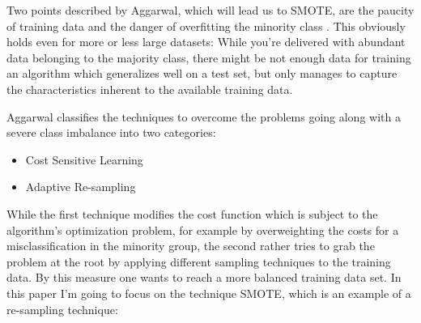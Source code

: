 \documentclass[12pt,a4paper]{article}
\begin{document}
Two points described by Aggarwal, which will lead us to SMOTE, are the paucity of training data and the danger of overfitting the minority class \cite{aggarwalClassBook}. This obviously holds even for more or less large datasets: While you're delivered with abundant data belonging to the majority class, there might be not enough data for training an algorithm which generalizes well on a test set, but only manages to capture the characteristics inherent to the available training data.\par
Aggarwal classifies the techniques to overcome the problems going along with a severe class imbalance into two categories:
\begin{itemize}
    \item Cost Sensitive Learning
    \item Adaptive Re-sampling
\end{itemize}
While the first technique modifies the cost function which is subject to the algorithm's optimization problem, for example by overweighting the costs for a misclassification in the minority group, the second rather tries to grab the problem at the root by applying different sampling techniques to the training data. By this measure one wants to reach a more balanced training data set. In this paper I'm going to focus on the technique SMOTE, which is an example of a re-sampling technique:
\end{document}
